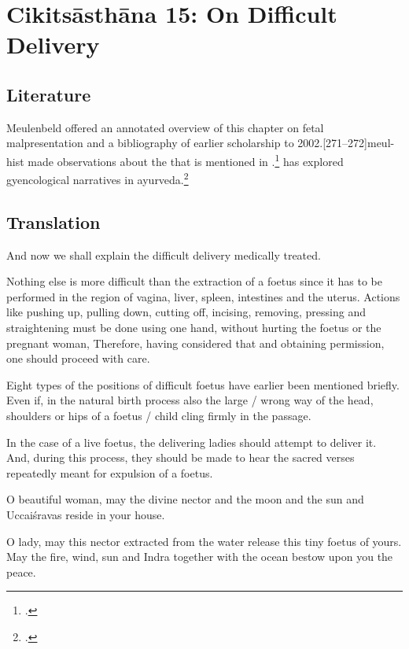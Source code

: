 
\chapter{Cikitsāsthāna 15:  On Difficult Delivery}


\section{Literature} 

Meulenbeld offered an annotated overview of this chapter on fetal
malpresentation and a bibliography of earlier scholarship to
2002.[271--272]{meul-hist}  \citeauthor{das-2003} made 
observations about the  that is mentioned in  
.\footcite[517]{das-2003}   \citeauthor{selb-2005} 
has explored gyencological 
narratives in ayurveda.\footcite{selb-2005,selb-2005b}

\section{Translation}

\begin{translation}
    

    \item [1]  And now we shall explain the difficult delivery medically treated.
    
    \item [3]   Nothing else is more difficult than the extraction of a
foetus since it has to be performed in the region of vagina, liver,
spleen, intestines and the uterus.  Actions like pushing up, pulling
down, cutting off, incising, removing, pressing and straightening
must be done using one hand, without hurting the foetus or the
pregnant woman, Therefore, having considered that and obtaining
permission, one should proceed with care.
    
    \item [4]  Eight types of the positions of difficult
foetus have earlier been mentioned briefly. Even if, in the natural birth process
also the large / wrong way of the head, shoulders or hips of a foetus
/ child cling firmly in the passage.
    
    \item [5]  In the case of a live foetus, the delivering ladies should
attempt to deliver it. And, during this process, they should be made
to hear the sacred verses repeatedly meant for expulsion of a foetus.
    
    \item [6]  O beautiful woman, may the divine nector and the moon
and the sun and Uccaiśravas reside in your house.
    
    \item [7]  O lady, may this nector extracted from the water release
this tiny foetus of yours. May the fire, wind, sun and Indra together
with the ocean bestow upon you the peace.

    
\end{translation}

